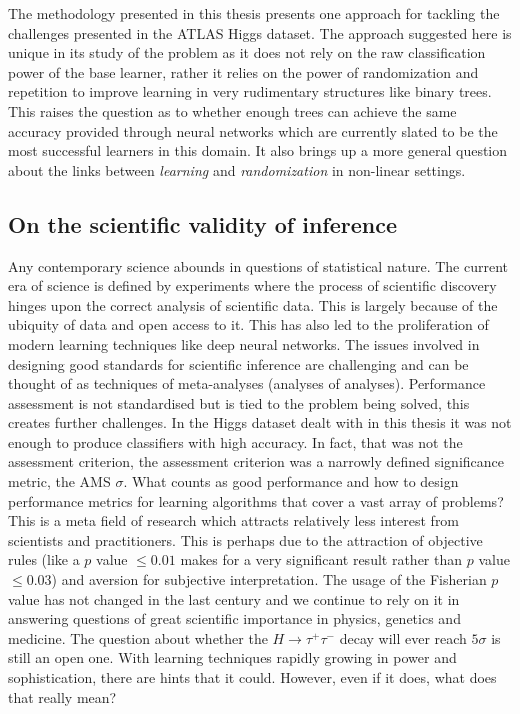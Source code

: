 The methodology presented in this thesis presents one approach for tackling the challenges presented in the ATLAS Higgs dataset. The approach suggested here is unique in its study of the problem as it does not rely on the raw classification power of the base learner, rather it relies on the power of randomization and repetition to improve learning in very rudimentary structures like binary trees. This raises the question as to whether enough trees can achieve the same accuracy provided through neural networks which are currently slated to be the most successful learners in this domain. It also brings up a more general question about the links between \textit{learning} and \textit{randomization} in non-linear settings. 

\subsection{On the scientific validity of inference}
Any contemporary science abounds in questions of statistical nature. The current era of science is defined by experiments where the process of scientific discovery hinges upon the correct analysis of scientific data. This is largely because of the ubiquity of data and open access to it. This has also led to the proliferation of modern learning techniques like deep neural networks. The issues involved in designing good standards for scientific inference are challenging and can be thought of as techniques of  meta-analyses (analyses of analyses). Performance assessment is not standardised but is tied to the problem being solved, this creates further challenges. In the Higgs dataset dealt with in this thesis it was not enough to produce classifiers with high accuracy. In fact, that was not the assessment criterion, the assessment criterion was a narrowly defined significance metric, the AMS $\sigma$. What counts as good performance and how to design performance metrics for learning algorithms that cover a vast array of problems? This is a meta field of research which attracts relatively less interest from scientists and practitioners. This is perhaps due to the attraction of objective rules (like a $p$ value $\leq 0.01$ makes for a very significant result rather than $p$ value $\leq 0.03$) and aversion for subjective interpretation. The usage of the Fisherian $p$ value has not changed in the last century and we continue to rely on it in answering questions of great scientific importance in physics, genetics and medicine. The question about whether the $H \rightarrow \tau^{+}\tau^{-}$ decay will ever reach $5\sigma$ is still an open one. With learning techniques rapidly growing in power and sophistication, there are hints that it could. However, even if it does, what does that really mean? 